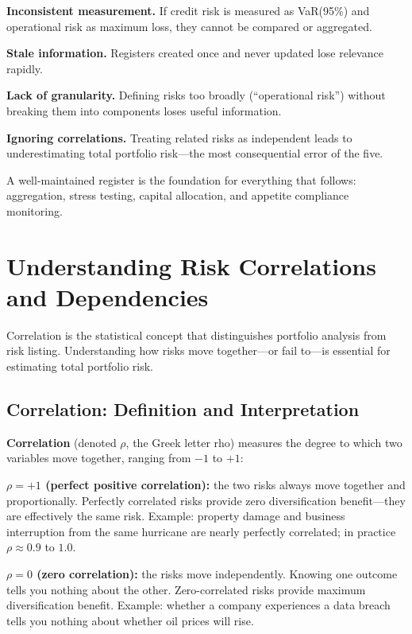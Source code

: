 \documentclass[11pt,openany]{book}
\begin{document}
\textbf{Inconsistent measurement.} If credit risk is measured as VaR(95\%) and
operational risk as maximum loss, they cannot be compared or aggregated.

\textbf{Stale information.} Registers created once and never updated lose
relevance rapidly.

\textbf{Lack of granularity.} Defining risks too broadly (``operational
risk'') without breaking them into components loses useful information.

\textbf{Ignoring correlations.} Treating related risks as independent leads to
underestimating total portfolio risk---the most consequential error of the
five.

A well-maintained register is the foundation for everything that follows:
aggregation, stress testing, capital allocation, and appetite compliance
monitoring.

\section{Understanding Risk Correlations and Dependencies}
\label{sec:correlations}

Correlation is the statistical concept that distinguishes portfolio analysis
from risk listing. Understanding how risks move together---or fail
to---is essential for estimating total portfolio risk.

\subsection{Correlation: Definition and Interpretation}
\label{subsec:correlation-definition}

\textbf{Correlation} (denoted \(\rho\), the Greek letter rho) measures the
degree to which two variables move together, ranging from \(-1\) to \(+1\):

\textbf{\(\rho = +1\) (perfect positive correlation):} the two risks always
move together and proportionally. Perfectly correlated risks provide zero
diversification benefit---they are effectively the same risk. Example:
property damage and business interruption from the same hurricane are nearly
perfectly correlated; in practice \(\rho \approx 0.9\) to \(1.0\).

\textbf{\(\rho = 0\) (zero correlation):} the risks move independently.
Knowing one outcome tells you nothing about the other. Zero-correlated risks
provide maximum diversification benefit. Example: whether a company
experiences a data breach tells you nothing about whether oil prices will
rise.
\end{document}

